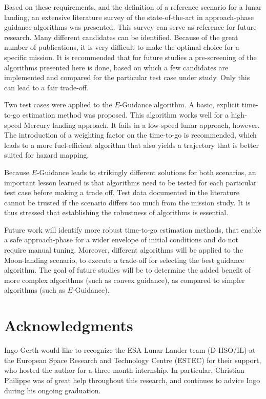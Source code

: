 \documentclass[%
]{aiaa-tc}
\begin{document}
Based on these requirements, and the definition of a reference scenario for a
lunar landing, an extensive literature survey of the state-of-the-art in
approach-phase guidance-algorithms was presented. This survey can serve as
reference for future research. Many different candidates can be identified.
Because of the great number of publications, it is very difficult to make the
optimal choice for a specific mission. It is recommended that for future studies
a pre-screening of the algorithms presented here is done, based on which a few
candidates are implemented and compared for the particular test case under
study. Only this can lead to a fair trade-off.

Two test cases were applied to the $E$-Guidance algorithm. A basic, explicit
time-to-go estimation method was proposed. This algorithm works well for a
high-speed Mercury landing approach. It fails in a low-speed lunar
approach, however. The introduction of a weighting factor on the time-to-go is
recommended, which leads to a more fuel-efficient algorithm that also yields
a trajectory that is better suited for hazard mapping.

Because $E$-Guidance leads to strikingly different solutions for both scenarios,
an important lesson learned is that algorithms need to be tested for each
particular test case before making a trade off. Test data documented in the
literature cannot be trusted if the scenario differs too much from the 
mission study. It is thus stressed that establishing the robustness of
algorithms is essential.

Future work will identify more robust time-to-go estimation methods, that enable
a safe approach-phase for a wider envelope of initial conditions and do not
require manual tuning. Moreover, different algorithms will be applied to the
Moon-landing scenario, to execute a trade-off for selecting the best guidance
algorithm. The goal of future studies will be to determine the added benefit of
more complex algorithms (such as convex guidance), as compared to simpler
algorithms (such as $E$-Guidance).


\section*{Acknowledgments}

Ingo Gerth would like to recognize the ESA Lunar Lander team (D-HSO/IL) at the
European Space Research and Technology Centre (ESTEC) for their support, who
hosted the author for a three-month internship. In particular, Christian
Philippe was of great help throughout this research, and continues to advice
Ingo during his ongoing graduation.
\enlargethispage*{2\baselineskip}




\end{document}
